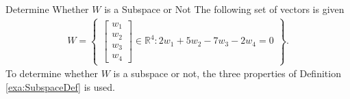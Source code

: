 \begin{example}{Determine Whether $W$ is a Subspace or Not}
The following set of vectors is given
\begin{align*}
    W = \begin{Bmatrix}
    \begin{bmatrix}
    w_1\\w_2\\w_3\\w_4
    \end{bmatrix}
        \in \mathbb{R}^4: 2w_1 + 5w_2 - 7w_3 -2w_4 = 0 
    \end{Bmatrix}.
\end{align*}
To determine whether $W$ is a subspace or not, the three properties of Definition \ref{exa:SubspaceDef} is used. \\


\end{example}
